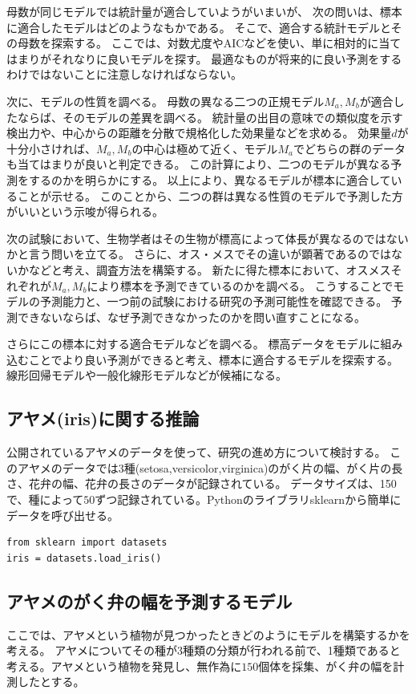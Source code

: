 母数が同じモデルでは統計量が適合していようがいまいが、
次の問いは、標本に適合したモデルはどのようなもかである。
そこで、適合する統計モデルとその母数を探索する。
ここでは、対数尤度やAICなどを使い、単に相対的に当てはまりがそれなりに良いモデルを探す。
最適なものが将来的に良い予測をするわけではないことに注意しなければならない。

次に、モデルの性質を調べる。
母数の異なる二つの正規モデル$M_a,M_b$が適合したならば、そのモデルの差異を調べる。
統計量の出目の意味での類似度を示す検出力や、中心からの距離を分散で規格化した効果量などを求める。
効果量$d$が十分小さければ、$M_a,M_b$の中心は極めて近く、モデル$M_a$でどちらの群のデータも当てはまりが良いと判定できる。
この計算により、二つのモデルが異なる予測をするのかを明らかにする。
以上により、異なるモデルが標本に適合していることが示せる。
このことから、二つの群は異なる性質のモデルで予測した方がいいという示唆が得られる。

次の試験において、生物学者はその生物が標高によって体長が異なるのではないかと言う問いを立てる。
さらに、オス・メスでその違いが顕著であるのではないかなどと考え、調査方法を構築する。
新たに得た標本において、オスメスそれぞれが$M_a,M_b$により標本を予測できているのかを調べる。
こうすることでモデルの予測能力と、一つ前の試験における研究の予測可能性を確認できる。
予測できないならば、なぜ予測できなかったのかを問い直すことになる。

さらにこの標本に対する適合モデルなどを調べる。
標高データをモデルに組み込むことでより良い予測ができると考え、標本に適合するモデルを探索する。
線形回帰モデルや一般化線形モデルなどが候補になる。


\subsection{アヤメ(iris)に関する推論}
公開されているアヤメのデータを使って、研究の進め方について検討する。
このアヤメのデータでは$3$種(setosa,versicolor,virginica)のがく片の幅、がく片の長さ、花弁の幅、花弁の長さのデータが記録されている。
データサイズは、150で、種によって$50$ずつ記録されている。Pythonのライブラリsklearnから簡単にデータを呼び出せる。
\begin{lstlisting}
from sklearn import datasets
iris = datasets.load_iris()
\end{lstlisting}

\subsection{アヤメのがく弁の幅を予測するモデル}
ここでは、アヤメという植物が見つかったときどのようにモデルを構築するかを考える。
アヤメについてその種が3種類の分類が行われる前で、1種類であると考える。アヤメという植物を発見し、無作為に$150$個体を採集、がく弁の幅を計測したとする。

